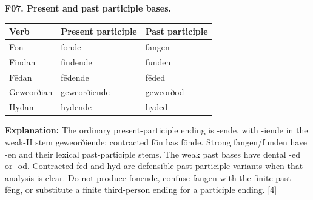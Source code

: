 \par\begin{minipage}{\linewidth}\raggedright
\textbf{F07. Present and past participle bases.}

\par\begingroup
\fontsize{10.5}{13.2}\selectfont
\setlength{\LTleft}{0pt}\setlength{\LTright}{\fill}
\noindent
\begin{tabular}{@{}>{\raggedright\arraybackslash}p{32.04mm}>{\raggedright\arraybackslash}p{47.09mm}>{\raggedright\arraybackslash}p{39.25mm}@{}}
\toprule
\textbf{Verb} & \textbf{Present participle} & \textbf{Past participle} \\
\midrule
Fōn & fōnde & fangen \\
Findan & findende & funden \\
Fēdan & fēdende & fēded \\
Geweorðian & geweorðiende & geweorðod \\
Hȳdan & hȳdende & hȳded \\
\bottomrule
\end{tabular}
\par\endgroup

\textbf{Explanation:} The ordinary present-participle ending is -ende, with -iende in the weak-II stem geweorðiende; contracted fōn has fōnde. Strong fangen/\allowbreak{}funden have -en and their lexical past-participle stems. The weak past bases have dental -ed or -od. Contracted fēd and hȳd are defensible past-participle variants when that analysis is clear. Do not produce fōnende, confuse fangen with the finite past fēng, or substitute a finite third-person ending for a participle ending. [4]

\end{minipage}\par\addvspace{4pt}

